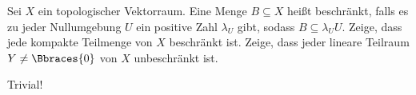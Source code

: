 \begin{exercise}

Sei $X$ ein topologischer Vektorraum.
Eine Menge $B \subseteq X$ heißt beschränkt, falls es zu jeder Nullumgebung $U$ ein positive Zahl $\lambda_U$ gibt, sodass $B \subseteq \lambda_U U$.
Zeige, dass jede kompakte Teilmenge von $X$ beschränkt ist. Zeige, dass jeder lineare Teilraum $Y \neq \Bbraces{0}$ von $X$ unbeschränkt ist.

\end{exercise}

\begin{solution}

Trivial!

\end{solution}
